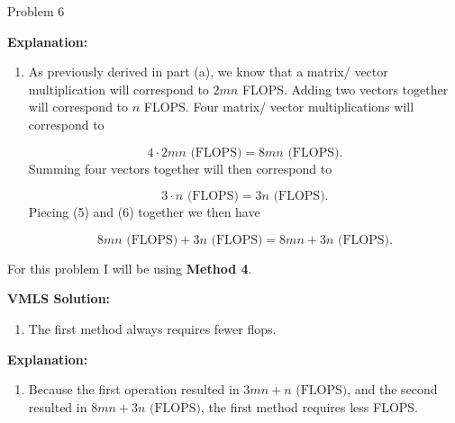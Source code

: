 \begin{problem}{Problem 6}
\begin{highlight}
        \noindent \textbf{Explanation:}

        \begin{enumerate}[label = (\alph*), start = 2]
            \item As previously derived in part (a), we know that a matrix/ vector multiplication will correspond to $2mn$ FLOPS. Adding two vectors together will correspond to $n$ FLOPS. Four matrix/ vector multiplications
            will correspond to 
    
            \begin{equation}
                4 \cdot 2mn \text{ (FLOPS)} = 8mn \text{ (FLOPS)}.
            \end{equation}
            Summing four vectors together will then correspond to 
    
            \begin{equation}
                3 \cdot n \text{ (FLOPS)} = 3n \text{ (FLOPS)}.
            \end{equation}
            Piecing (5) and (6) together we then have
    
            \begin{equation}
                8mn \text{ (FLOPS)} + 3n \text{ (FLOPS)} = 8mn + 3n \text{ (FLOPS)}.
            \end{equation}
        \end{enumerate}
    \end{highlight}

    \begin{highlight}
        For this problem I will be using \textbf{Method 4}. \vspace*{1em}

        \noindent \textbf{VMLS Solution:}

        \begin{enumerate}[label = (\alph*), start = 3]
            \item The first method always requires fewer flops.
        \end{enumerate}

        \noindent \textbf{Explanation:}

        \begin{enumerate}[label = (\alph*), start = 3]
            \item Because the first operation resulted in $3mn + n \text{ (FLOPS)}$, and the second resulted in $8mn + 3n \text{ (FLOPS)}$, the first method requires less FLOPS.
        \end{enumerate}
    \end{highlight}
\end{problem}

